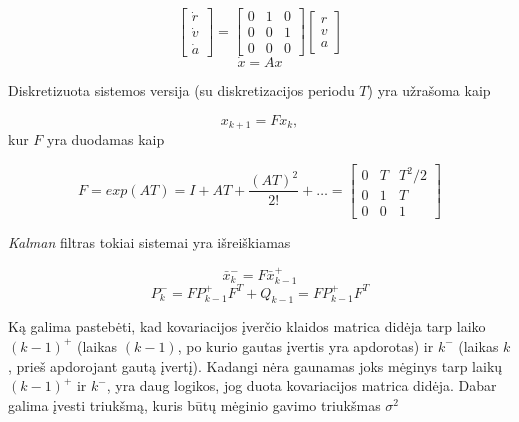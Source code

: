     \begin{equation}
        \begin{bmatrix} \dot{r} \\ \dot{v} \\ \dot{a} \end{bmatrix} =
        \begin{bmatrix} 0 & 1 & 0 \\ 0 & 0 & 1 \\ 0 & 0 & 0 \end{bmatrix}
        \begin{bmatrix} r \\ v \\ a \end{bmatrix}
    \end{equation}
    \begin{equation}
        \dot{x} = Ax
    \end{equation}

    Diskretizuota sistemos versija (su diskretizacijos periodu $T$) yra užrašoma kaip\

    \begin{equation}
        x_{k+1} = Fx_k,
    \end{equation}
    kur $F$ yra duodamas kaip

    \begin{equation}
        F = exp(AT) = I + AT + \frac{(AT)^2}{2!} + \dots =
        \begin{bmatrix}
            0 & T & T^2/2 \\
            0 & 1 & T \\
            0 & 0 & 1
        \end{bmatrix}
    \end{equation}

    \textit{Kalman} filtras tokiai sistemai yra išreiškiamas

    \begin{equation}
        \bar{x}_k^- = F\bar{x}_{k-1}^+
    \end{equation}
    \begin{equation}
        P_k^- = FP_{k-1}^+ F^T + Q_{k-1} = FP_{k-1}^+ F^T
    \end{equation}

    Ką galima pastebėti, kad kovariacijos įverčio klaidos matrica didėja tarp laiko $(k-1)^+$ (laikas $(k-1)$, po kurio gautas įvertis yra apdorotas) ir $k^-$ (laikas $k$, prieš apdorojant gautą įvertį).
    Kadangi nėra gaunamas joks mėginys tarp laikų $(k-1)^+$ ir $k^-$, yra daug logikos, jog duota kovariacijos matrica didėja.
    Dabar galima įvesti triukšmą, kuris būtų mėginio gavimo triukšmas $\sigma^2$

